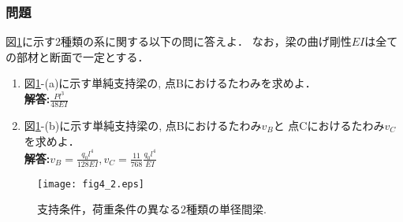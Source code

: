 \documentclass[10pt,a4j]{jarticle}
\begin{document}
\subsubsection{問題}
図\ref{fig:fig2_4}に示す2種類の系に関する以下の問に答えよ．
なお，梁の曲げ剛性$EI$は全ての部材と断面で一定とする．
\begin{enumerate}
\item
	図\ref{fig:fig2_4}-(a)に示す単純支持梁の, 点Bにおけるたわみを求めよ．\\
	{\bf 解答:}$\frac{Pl^3}{48EI}$
\item
	図\ref{fig:fig2_4}-(b)に示す単純支持梁の, 点Bにおけるたわみ$v_B$と
	点Cにおけるたわみ$v_C$を求めよ．\\
	{\bf 解答:}$v_B=\frac{q_0l^4}{128EI}, v_C=\frac{11}{768}\frac{q_0l^4}{EI}$
\end{enumerate}
\begin{figure}[h]
	\begin{center}
	\texttt{[image: fig4\_2.eps]} 
	\end{center}
	\caption{支持条件，荷重条件の異なる2種類の単径間梁.} 
	\label{fig:fig2_4}
\end{figure}
\end{document}
